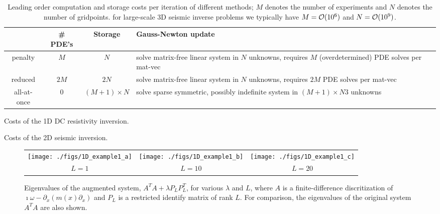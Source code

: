 \documentclass{iopart}
\begin{document}
\begin{table}
\begin{tabular}{c|c|c|p{5cm}}
         & \# PDE's & Storage & Gauss-Newton update \\
\hline
penalty  &  $M$  &    $N$     & solve matrix-free linear system in $N$ unknowns, requires $M$ (overdetermined) PDE solves per mat-vec \\
\hline
reduced  &  $2M $  &    $2N$     & solve matrix-free linear system in $N$ unknowns, requires $2M$ PDE solves per mat-vec                   \\
\hline
all-at-once&   0   &    $(M+1) \times N$   &  solve sparse symmetric, possibly indefinite system in $(M + 1) \times N3$ unknowns \\ 
\end{tabular}
\caption{Leading order computation and storage costs per iteration of different methods; $M$ denotes the number of experiments and $N$ denotes the number of gridpoints.
for large-scale 3D seismic inverse problems we typically have $M = \mathcal{O}(10^6)$ and $N = \mathcal{O}(10^9)$.}
\label{table:costs}
\end{table}

\begin{table}
\centering

\caption{Costs of the 1D DC resistivity inversion.}
\label{table:1D_exp1}
\end{table}

\begin{table}
\centering

\caption{Costs of the 2D seismic inversion.}
\label{table:2D_exp1}
\end{table}

\clearpage

\begin{figure}
\centering
\begin{tabular}{ccc}
\texttt{[image: ./figs/1D\_example1\_a]}&
\texttt{[image: ./figs/1D\_example1\_b]}&
\texttt{[image: ./figs/1D\_example1\_c]}\\
{\small $L = 1$}&{\small $L = 10$}&{\small $L = 20$}\\
\end{tabular}
\caption{Eigenvalues of the augmented system,  $A^TA + \lambda P_LP_L^T$, for various $\lambda$ and $L$, where $A$ is a finite-difference discritization of $\imath\omega - \partial_x\left(m(x)\partial_x\right)$
and $P_L$ is a restricted identify matrix of rank $L$. For comparison, the eigenvalues of the original system $A^TA$ are also shown.}
\label{fig:example2}
\end{figure}
\end{document}

